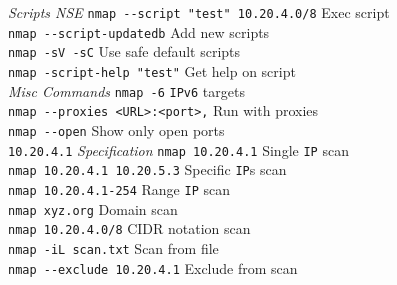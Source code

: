 \documentclass[a4paper,10pt]{article}
\begin{document}
\begin{multicols}{3}
\textit{Scripts NSE}
\vskip-5pt
\verb|nmap --script "test" 10.20.4.0/8| \dotfill Exec script\\
\verb|nmap --script-updatedb| \dotfill Add new scripts\\
\verb|nmap -sV -sC| \dotfill Use safe default scripts\\
\verb|nmap -script-help "test"| \dotfill Get help on script\\

\textit{Misc Commands}
\vskip-5pt
\verb|nmap -6| \dotfill \verb|IPv6| targets\\
\verb|nmap --proxies <URL>:<port>,| \dotfill Run with proxies\\
\verb|nmap --open| \dotfill Show only open ports\\

\verb|10.20.4.1| \textit{Specification}
\vskip-5pt
\verb|nmap 10.20.4.1| \dotfill Single \verb|IP| scan\\
\verb|nmap 10.20.4.1 10.20.5.3| \dotfill Specific \verb|IP|s scan\\
\verb|nmap 10.20.4.1-254| \dotfill Range \verb|IP| scan\\
\verb|nmap xyz.org| \dotfill Domain scan\\
\verb|nmap 10.20.4.0/8| \dotfill CIDR notation scan\\
\verb|nmap -iL scan.txt| \dotfill Scan from file\\
\verb|nmap --exclude 10.20.4.1| \dotfill Exclude from scan\\

\end{multicols}
\end{document}
